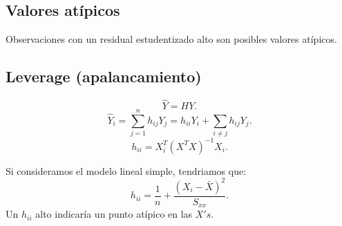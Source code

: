 \documentclass{article}
\begin{document}
\subsection{Valores atípicos}
Observaciones con un residual estudentizado alto son posibles valores atípicos.

\subsection{Leverage (apalancamiento)}
\[ \hat{Y}=HY .\]
\[ \hat{Y}_{i}=\sum_{j=1}^{n}h_{ij}Y_{j}=h_{ii}Y_{i}+\sum_{i \neq j}h_{ij}Y_{j}.\]
\[ h_{ii}=X^{T}_{i}(X^{T}X)^{-1}X_{i} .\]

Si consideramos el modelo lineal simple, tendriamos que:
\[ h_{ii}=\frac{1}{n}+\frac{(X_{i}-\bar{X})^{2}}{S_{xx}} .\]
Un $h_{ii}$ alto indicaría un punto atípico en las $X's$.
\end{document}
